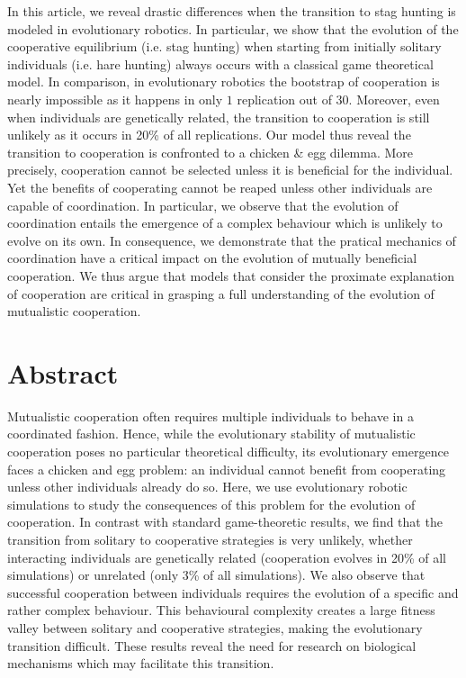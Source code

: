 In this article, we reveal drastic differences when the transition to stag hunting is modeled in evolutionary robotics. In particular, we show that the evolution of the cooperative equilibrium (i.e. stag hunting) when starting from initially solitary individuals (i.e. hare hunting) always occurs with a classical game theoretical model. In comparison, in evolutionary robotics the bootstrap of cooperation is nearly impossible as it happens in only $1$ replication out of $30$. Moreover, even when individuals are genetically related, the transition to cooperation is still unlikely as it occurs in 20\% of all replications. Our model thus reveal the transition to cooperation is confronted to a chicken \& egg dilemma. More precisely, cooperation cannot be selected unless it is beneficial for the individual. Yet the benefits of cooperating cannot be reaped unless other individuals are capable of coordination. In particular, we observe that the evolution of coordination entails the emergence of a complex behaviour which is unlikely to evolve on its own. In consequence, we demonstrate that the pratical mechanics of coordination have a critical impact on the evolution of mutually beneficial cooperation. We thus argue that models that consider the proximate explanation of cooperation are critical in grasping a full understanding of the evolution of mutualistic cooperation.

\clearpage


\section{Abstract}
  Mutualistic cooperation often requires multiple individuals to behave in a coordinated fashion. Hence, while the evolutionary stability of mutualistic cooperation poses no particular theoretical difficulty, its evolutionary emergence faces a chicken and egg problem: an individual cannot benefit from cooperating unless other individuals already do so. Here, we use evolutionary robotic simulations to study the consequences of this problem for the evolution of cooperation. In contrast with standard game-theoretic results, we find that the transition from solitary to cooperative strategies is very unlikely, whether interacting individuals are genetically related (cooperation evolves in 20\% of all simulations) or unrelated (only 3\% of all simulations). We also observe that successful cooperation between individuals requires the evolution of a specific and rather complex behaviour. This behavioural complexity creates a large fitness valley between solitary and cooperative strategies, making the evolutionary transition difficult. These results reveal the need for research on biological mechanisms which may facilitate this transition.


